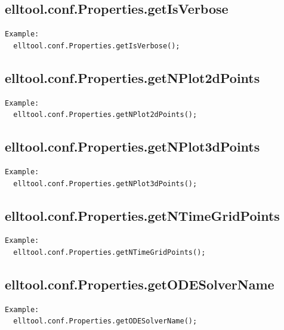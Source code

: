\documentclass[letterpaper,10pt,english]{sphinxmanual}
\begin{document}
\subsection{elltool.conf.Properties.getIsVerbose}
\label{chap_functions:elltool-conf-properties-getisverbose}
\begin{Verbatim}[commandchars=\\\{\}]
Example:
  elltool.conf.Properties.getIsVerbose();
\end{Verbatim}


\subsection{elltool.conf.Properties.getNPlot2dPoints}
\label{chap_functions:elltool-conf-properties-getnplot2dpoints}
\begin{Verbatim}[commandchars=\\\{\}]
Example:
  elltool.conf.Properties.getNPlot2dPoints();
\end{Verbatim}


\subsection{elltool.conf.Properties.getNPlot3dPoints}
\label{chap_functions:elltool-conf-properties-getnplot3dpoints}
\begin{Verbatim}[commandchars=\\\{\}]
Example:
  elltool.conf.Properties.getNPlot3dPoints();
\end{Verbatim}


\subsection{elltool.conf.Properties.getNTimeGridPoints}
\label{chap_functions:elltool-conf-properties-getntimegridpoints}
\begin{Verbatim}[commandchars=\\\{\}]
Example:
  elltool.conf.Properties.getNTimeGridPoints();
\end{Verbatim}


\subsection{elltool.conf.Properties.getODESolverName}
\label{chap_functions:elltool-conf-properties-getodesolvername}
\begin{Verbatim}[commandchars=\\\{\}]
Example:
  elltool.conf.Properties.getODESolverName();
\end{Verbatim}
\end{document}
